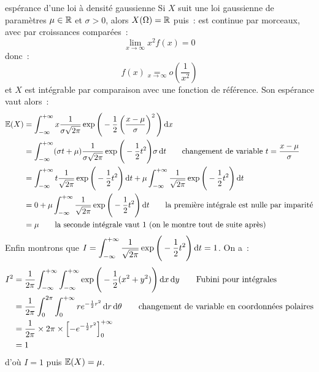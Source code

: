 \begin{exemple}{}{espérance d'une loi à densité gaussienne}
    Si $X$ suit une loi gaussienne de paramètres $\mu \in \mathbb{R}$ et $\sigma > 0$, alors $X(\Omega) = \mathbb{R}$ puis~:
    est continue par morceaux, avec par croissances comparées~:
    $$\lim_{x \to \infty} x^2 f(x) = 0$$
    donc~:
    $$f(x) \underset{x \to \infty}{=} o\left(\frac{1}{x^2}\right)$$
    et $X$ est intégrable par comparaison avec une fonction de référence. Son espérance vaut alors~:
    \begin{align*}
        \mathbb{E}(X) &= \int_{-\infty}^{+\infty} x \frac1{\sigma \sqrt{2\pi}}\operatorname \exp\Bigg(-\frac12\left(\frac{x-\mu}{\sigma}\right)^2\Bigg)\,\mathrm{d}x\\
        &= \int_{-\infty}^{+\infty} (\sigma t + \mu) \frac1{\sigma \sqrt{2\pi}}\operatorname \exp\Bigg(-\frac12 t^2\Bigg) \sigma\,\mathrm{d}t \qquad\text{changement de variable } t = \frac{x-\mu}{\sigma}\\
        &= \int_{-\infty}^{+\infty} t \frac1{\sqrt{2\pi}}\operatorname \exp\Bigg(-\frac12 t^2\Bigg)\,\mathrm{d}t + \mu \int_{-\infty}^{+\infty}  \frac1{\sqrt{2\pi}}\operatorname \exp\Bigg(-\frac12 t^2\Bigg)\,\mathrm{d}t\\
        &= 0 + \mu\int_{-\infty}^{+\infty}  \frac1{\sqrt{2\pi}}\operatorname \exp\Bigg(-\frac12 t^2\Bigg)\,\mathrm{d}t \qquad\text{la première intégrale est nulle par imparité}\\
        &= \mu \qquad \text{la seconde intégrale vaut 1 (on le montre tout de suite après)}
    \end{align*}
    Enfin montrons que $\displaystyle I = \int_{-\infty}^{+\infty}  \frac1{\sqrt{2\pi}}\operatorname \exp\Bigg(-\frac12 t^2\Bigg)\,\mathrm{d}t = 1$. On a~:
    \begin{align*}
        I^2 &= \frac{1}{2\pi} \int_{-\infty}^{+\infty} \int_{-\infty}^{+\infty} \operatorname \exp\Bigg(-\frac12 (x^2 + y^2)\Bigg)\,\mathrm{d}x\,\mathrm{d}y \qquad\text{Fubini pour intégrales}\\
        &= \frac{1}{2\pi} \int_0^{2\pi} \int_0^{+\infty} re^{-\frac12 r^2}\,\mathrm{d}r\,\mathrm{d}\theta \qquad\text{changement de variable en coordonnées polaires}\\
        &= \frac{1}{2\pi} \times 2\pi \times \left[-e^{-\frac12 r^2}\right]_0^{+\infty}\\
        &= 1
    \end{align*}
    d'où $I = 1$ puis $\mathbb{E}(X) = \mu$.
\end{exemple}

